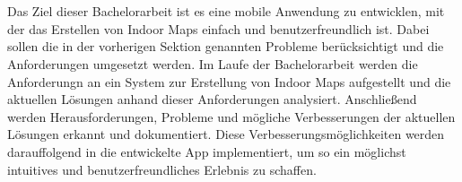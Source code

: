 \section{
}
Das Ziel dieser Bachelorarbeit ist es eine mobile Anwendung zu entwicklen, mit der das Erstellen von Indoor Maps einfach und benutzerfreundlich ist. Dabei sollen die in der vorherigen Sektion genannten Probleme berücksichtigt und die Anforderungen umgesetzt werden. Im Laufe der Bachelorarbeit werden die Anforderungn an ein System zur Erstellung von Indoor Maps aufgestellt und die aktuellen Lösungen anhand dieser Anforderungen analysiert. Anschließend werden Herausforderungen, Probleme und mögliche Verbesserungen der aktuellen Lösungen erkannt und dokumentiert. Diese Verbesserungsmöglichkeiten werden darauffolgend in die entwickelte App implementiert, um so ein möglichst intuitives und benutzerfreundliches Erlebnis zu schaffen.%
%
\section{
}
%
\section{
}
